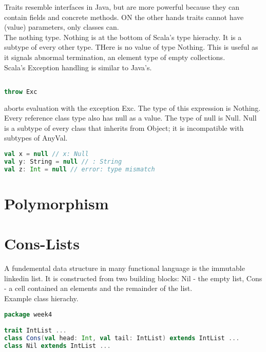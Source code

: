\documentclass[10pt, a4paper]{report}
\begin{document}
Traits resemble interfaces in Java, but are more powerful because they can contain fields and concrete methods. ON the other hands traits cannot have (value) parameters, only classes can.\\

The nothing type. Nothing is at the bottom of Scala's type hierachy. It is a subtype of every other type. THere is no value of type Nothing. This is useful as it signals abnormal termination, an element type of empty collections.\\

Scala's Exception handling is similar to Java's.
\begin{lstlisting}[language=scala]

throw Exc

\end{lstlisting}

aborts evaluation with the exception Exc. The  type of this expression is Nothing.\\

Every reference class type also has null as a value. The type of null is Null. Null is a subtype of every class that inherits from Object; it is incompatible with subtypes of AnyVal.

\begin{lstlisting}[language=scala]
val x = null // x: Null
val y: String = null // : String
val z: Int = null // error: type mismatch

\end{lstlisting}

\section{Polymorphism}

\section{Cons-Lists}

A fundemental data structure in many functional language is the immutable linkedin list. It is constructed from two building blocks: Nil - the empty list, Cons - a cell contained an elements and the remainder of the list.\\ Example class hierachy.

\begin{lstlisting}[language=scala]
package week4

trait IntList ...
class Cons(val head: Int, val tail: IntList) extends IntList ...
class Nil extends IntList ...

\end{lstlisting}
\end{document}
